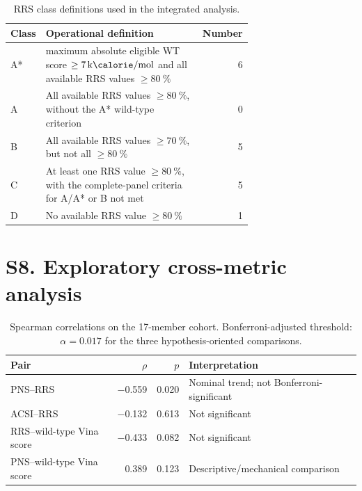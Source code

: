 \documentclass[journal=jcisd8,manuscript=suppinfo]{achemso}
\begin{document}
\begin{table}[h]
\centering
\caption{RRS class definitions used in the integrated analysis.}
\label{tab:rrs_classes}
\begin{tabular}{@{}l>{\raggedright\arraybackslash}p{0.69\linewidth}r@{}}
\toprule
Class & Operational definition & Number \\
\midrule
A* & maximum absolute eligible WT score $\geq\qty{7}{\kilo\calorie\per\mole}$ and all available RRS values $\geq\qty{80}{\percent}$ & 6 \\
A & All available RRS values $\geq\qty{80}{\percent}$, without the A* wild-type criterion & 0 \\
B & All available RRS values $\geq\qty{70}{\percent}$, but not all $\geq\qty{80}{\percent}$ & 5 \\
C & At least one RRS value $\geq\qty{80}{\percent}$, with the complete-panel criteria for A/A* or B not met & 5 \\
D & No available RRS value $\geq\qty{80}{\percent}$ & 1 \\
\bottomrule
\end{tabular}
\end{table}

\section*{S8. Exploratory cross-metric analysis}
\begin{table}[h]
\centering
\caption{Spearman correlations on the 17-member cohort. Bonferroni-adjusted threshold: $\alpha=\num{0.017}$ for the three hypothesis-oriented comparisons.}
\label{tab:crossmetric}
\begin{tabular}{@{}lrrl@{}}
\toprule
Pair & $\rho$ & $p$ & Interpretation \\
\midrule
PNS--RRS & \num{-0.559} & \num{0.020} & Nominal trend; not Bonferroni-significant \\
ACSI--RRS & \num{-0.132} & \num{0.613} & Not significant \\
RRS--wild-type Vina score & \num{-0.433} & \num{0.082} & Not significant \\
PNS--wild-type Vina score & \num{0.389} & \num{0.123} & Descriptive/mechanical comparison \\
\bottomrule
\end{tabular}
\end{table}
\end{document}
